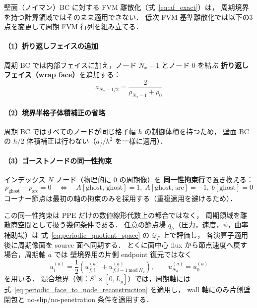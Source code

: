 壁面（ノイマン）BC に対する FVM 離散化（式~\eqref{eq:af_exact}）は，
周期境界を持つ計算領域ではそのまま適用できない．
低次 FVM 基準離散化では以下の3点を変更して周期 FVM 行列を組み立てる．

\paragraph{（1）折り返しフェイスの追加}
周期 BC では内部フェイスに加え，ノード $N_x-1$ とノード $0$ を結ぶ
\textbf{折り返しフェイス（wrap face）}を追加する：
\begin{equation}
  a_{N_x - 1/2} = \frac{2}{\rho_{N_x-1} + \rho_0}
  \label{eq:af_wrap}
\end{equation}

\paragraph{（2）境界半格子体積補正の省略}
周期 BC ではすべてのノードが同じ格子幅 $h$ の制御体積を持つため，
壁面 BC の $h/2$ 体積補正は行わない（$a_f / h^2$ を一様に適用）．

\paragraph{（3）ゴーストノードの同一性拘束}
インデックス $N$ ノード（物理的に $0$ の周期像）を
\textbf{同一性拘束行}で置き換える：
\begin{equation}
  p_{\mathrm{ghost}} - p_{\mathrm{src}} = 0
  \quad\Longleftrightarrow\quad
  A[\mathrm{ghost},\,\mathrm{ghost}] = 1,\;
  A[\mathrm{ghost},\,\mathrm{src}]   = -1,\;
  b[\mathrm{ghost}] = 0
  \label{eq:ghost_identity}
\end{equation}
コーナー節点は最初の軸の拘束のみを採用する（重複適用を避けるため）．

この同一性拘束は PPE だけの数値線形代数上の都合ではなく，
周期領域を離散商空間として扱う幾何条件である．
任意の節点場 $q_h$（圧力，速度，$\psi$，曲率補助場）は
式~\eqref{eq:periodic_quotient_space} の $\mathcal{Q}_P$ 上で評価し，
各演算子適用後に周期像面を source 面へ同期する．
とくに面中心 flux から節点速度へ戻す場合，周期軸 $a$ では
壁境界用の片側 endpoint 復元ではなく
\begin{equation}
  u_{i}^{(a)}
  =
  \frac{1}{2}
  \left(
    u_{f,i}^{(a)}
    +
    u_{f,i-1\ \mathrm{mod}\ N_a}^{(a)}
  \right),
  \qquad
  u_{N_a}^{(a)}=u_{0}^{(a)}
  \label{eq:periodic_face_to_node_reconstruction}
\end{equation}
を用いる．
混合境界（例：$S^1\times[0,L_y]$）では，周期軸には
式~\eqref{eq:periodic_face_to_node_reconstruction} を適用し，
wall 軸にのみ片側壁閉包と no-slip/no-penetration 条件を適用する．

